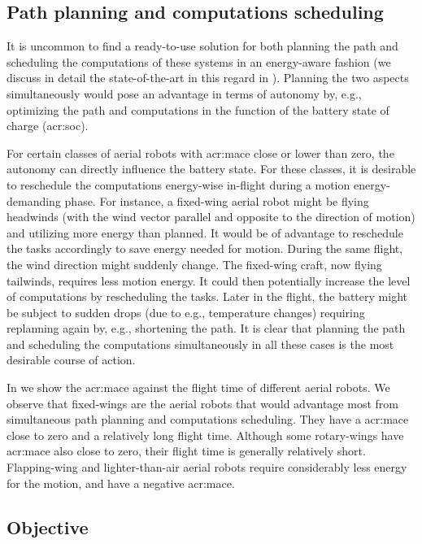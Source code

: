\subsection{Path planning and computations scheduling}

It is uncommon to find a ready-to-use solution for both planning the path and scheduling the computations of these systems in an energy-aware fashion (we discuss in detail the state-of-the-art in this regard in ). Planning the two aspects simultaneously would pose an advantage in terms of autonomy by, e.g., optimizing the path and computations in the function of the battery state of charge (\Gls{acr:soc}). 

For certain classes of aerial robots with \Gls{acr:mace} close or lower than zero, the autonomy can directly influence the battery state. For these classes, it is desirable to reschedule the computations energy-wise in-flight during a motion energy-demanding phase. For instance, a fixed-wing aerial robot might be flying headwinds (with the wind vector parallel and opposite to the direction of motion) and utilizing more energy than planned. It would be of advantage to reschedule the tasks accordingly to save energy needed for motion. During the same flight, the wind direction might suddenly change. The fixed-wing craft, now flying tailwinds, requires less motion energy. It could then potentially increase the level of computations by rescheduling the tasks. Later in the flight, the battery might be subject to sudden drops (due to e.g., temperature changes) requiring replanning again by, e.g., shortening the path. It is clear that planning the path and scheduling the computations simultaneously in all these cases is the most desirable course of action.

In  we show the \Gls{acr:mace} against the flight time of different aerial robots. We observe that fixed-wings are the aerial robots that would advantage most from simultaneous path planning and computations scheduling. They have a \Gls{acr:mace} close to zero and a relatively long flight time. Although some rotary-wings have \Gls{acr:mace} also close to zero, their flight time is generally relatively short. Flapping-wing and lighter-than-air aerial robots require considerably less energy for the motion, and have a negative \Gls{acr:mace}.

\subsection{Objective}

